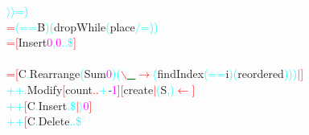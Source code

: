 \textcolor{cyan}{\ensuremath{\rangle}\ensuremath{\rangle}=}\textcolor{cyan}{)}\\\hsspace \textcolor{red}{=}\hsspace \textcolor{cyan}{(}\textcolor{cyan}{==}{\rm{}B}\textcolor{cyan}{)}\hsspace \textcolor{cyan}{(}{\rm{}dropWhile}\hsspace \textcolor{cyan}{(}{\rm{}place}\hsspace \textcolor{cyan}{/=}\textcolor{cyan}{)}\textcolor{cyan}{)}\\\hsspace \textcolor{red}{=}\hsspace \textcolor{red}{[}{\rm{}Insert}\hsspace \textcolor{magenta}{0}\textcolor{cyan}{,}\hsspace \textcolor{magenta}{0}\hsspace \textcolor{cyan}{.}\hsspace \textcolor{cyan}{.}\hsspace \textcolor{cyan}{\$}\textcolor{red}{]}\\\\\hstab \hstab \textcolor{red}{=}\hsspace \hsspace \textcolor{red}{[}{\rm{}C}\textcolor{cyan}{.}{\rm{}Rearrange}\hsspace \textcolor{cyan}{(}{\rm{}Sum}\hsspace \textcolor{magenta}{0}\textcolor{cyan}{)}\hsspace \textcolor{cyan}{(}\textcolor{red}{$\backslash$}\textcolor{green}{\underline{\_}}\hsspace \textcolor{red}{\ensuremath{\rightarrow}}\hsspace \textcolor{cyan}{(}{\rm{}findIndex}\hsspace \textcolor{cyan}{(}\textcolor{cyan}{==}{\rm{}i}\textcolor{cyan}{)}\hsspace \textcolor{cyan}{(}{\rm{}reordered}\textcolor{cyan}{)}\textcolor{cyan}{)}\textcolor{cyan}{)}\hsspace \textcolor{red}{\ensuremath{|}}\textcolor{red}{]}\\\hstab \hstab \textcolor{cyan}{++}\textcolor{cyan}{.}{\rm{}Modify}\hsspace \textcolor{red}{[}{\rm{}count}\hsspace \textcolor{red}{..}\hsspace \textcolor{cyan}{+}\hsspace \textcolor{blue}{{\it{}-}}\hsspace \textcolor{magenta}{1}\textcolor{red}{]}\hsspace \textcolor{red}{[}{\rm{}create}\hsspace \textcolor{red}{\ensuremath{|}}\hsspace \textcolor{cyan}{(}{\rm{}S}\textcolor{cyan}{,}\textcolor{cyan}{)}\hsspace \textcolor{red}{\ensuremath{\leftarrow}}\textcolor{red}{]}\\\hstab \hstab \textcolor{cyan}{++}\hsspace \textcolor{red}{[}{\rm{}C}\textcolor{cyan}{.}{\rm{}Insert}\hsspace \textcolor{cyan}{.}\hsspace \hsspace \hsspace \hsspace \hsspace \hsspace \hsspace \hsspace \hsspace \hsspace \textcolor{cyan}{\$}\hsspace \textcolor{red}{\ensuremath{|}}\hsspace \textcolor{cyan}{\ensuremath{\rangle}}\hsspace \textcolor{magenta}{0}\textcolor{red}{]}\\\hstab \hstab \textcolor{cyan}{++}\hsspace \textcolor{red}{[}{\rm{}C}\textcolor{cyan}{.}{\rm{}Delete}\hsspace \textcolor{cyan}{.}\hsspace \textcolor{cyan}{.}\hsspace \textcolor{cyan}{\$}\hsspace 